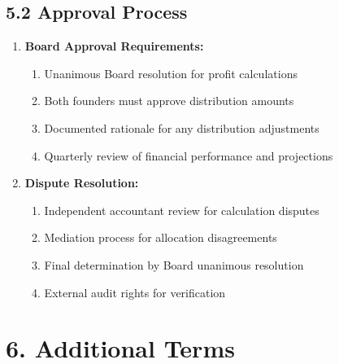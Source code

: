 \subsection*{5.2 Approval Process}
\begin{enumerate}[label=\arabic*.]
\item \textbf{Board Approval Requirements:}
    \begin{enumerate}[label=(\alph*)]
    \item Unanimous Board resolution for profit calculations
    \item Both founders must approve distribution amounts
    \item Documented rationale for any distribution adjustments
    \item Quarterly review of financial performance and projections
    \end{enumerate}

\item \textbf{Dispute Resolution:}
    \begin{enumerate}[label=(\alph*)]
    \item Independent accountant review for calculation disputes
    \item Mediation process for allocation disagreements
    \item Final determination by Board unanimous resolution
    \item External audit rights for verification
    \end{enumerate}
\end{enumerate}

\section*{6. Additional Terms}

